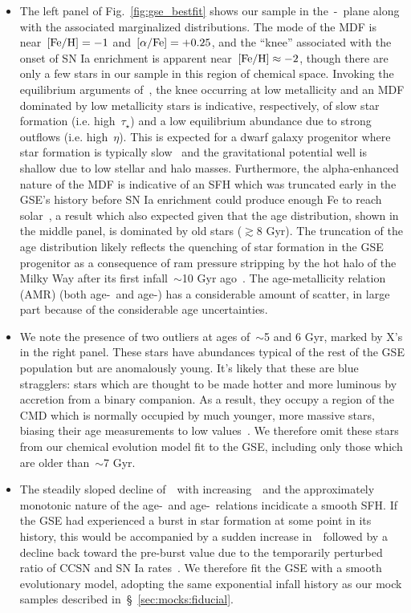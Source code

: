 \documentclass[ms.tex]{subfiles}
\begin{document}
\begin{itemize}
	\item The left panel of Fig.~\ref{fig:gse_bestfit} shows our sample in
	the~\afe-\feh~plane along with the associated marginalized distributions.
	The mode of the MDF is near~$\text{[Fe/H]} = -1$ and~$\text{[$\alpha$/Fe]} = +0.25$, and the
	``knee'' associated with the onset of SN Ia enrichment is apparent
	near~$\text{[Fe/H]} \approx -2$, though there are only a few stars in our sample
	in this region of chemical space.
	Invoking the equilibrium arguments of~\citet{Weinberg2017}, the knee
	occurring at low metallicity and an MDF dominated by low metallicity stars
	is indicative, respectively, of slow star formation (i.e. high~$\tau_\star$)
	and a low equilibrium abundance due to strong outflows (i.e. high~$\eta$).
	This is expected for a dwarf galaxy progenitor where star formation is
	typically slow~\citep[e.g.][]{Hudson2015} and the gravitational potential
	well is shallow due to low stellar and halo masses.
	Furthermore, the alpha-enhanced nature of the MDF is indicative of an SFH
	which was truncated early in the GSE's history before SN Ia enrichment
	could produce enough Fe to reach solar~\afe, a result which also expected
	given that the age distribution, shown in the middle panel, is dominated
	by old stars ($\gtrsim 8$ Gyr).
	The truncation of the age distribution likely reflects the quenching of
	star formation in the GSE progenitor as a consequence of ram pressure
	stripping by the hot halo of the Milky Way after its first infall~$\sim$10
	Gyr ago~\citep{Bonaca2020}.
	The age-metallicity relation (AMR) (both age-\feh~and age-\afe) has a
	considerable amount of scatter, in large part because of the considerable
	age uncertainties.

	\item We note the presence of two outliers at ages of~$\sim$5 and 6 Gyr,
	marked by X's in the right panel.
	These stars have abundances typical of the rest of the GSE population but
	are anomalously young.
	It's likely that these are blue stragglers: stars which are thought to be
	made hotter and more luminous by accretion from a binary companion.
	As a result, they occupy a region of the CMD which is normally occupied by
	much younger, more massive stars, biasing their age measurements to low
	values~\citep[e.g.][]{Bond1971, Stryker1993}.
	We therefore omit these stars from our chemical evolution model fit to the
	GSE, including only those which are older than~$\sim$7 Gyr.

	\item The steadily sloped decline of~\afe~with increasing~\feh~and the
	approximately monotonic nature of the age-\feh~and age-\afe~relations
	incidicate a smooth SFH.
	If the GSE had experienced a burst in star formation at some point in its
	history, this would be accompanied by a sudden increase in~\afe~followed by
	a decline back toward the pre-burst value due to the temporarily perturbed
	ratio of CCSN and SN Ia rates~\citep{Johnson2020}.
	We therefore fit the GSE with a smooth evolutionary model, adopting the
	same exponential infall history as our mock samples described
	in~\S~\ref{sec:mocks:fiducial}.


\end{itemize}
\end{document}
